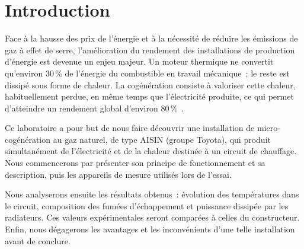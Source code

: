 \section{Introduction}
\label{sec:introduction}

Face à la hausse des prix de l'énergie et à la nécessité de réduire les émissions de gaz à effet de serre, l'amélioration du rendement des installations de production d'énergie est devenue un enjeu majeur. Un moteur thermique ne convertit qu'environ 30\,\% de l'énergie du combustible en travail mécanique~; le reste est dissipé sous forme de chaleur. La cogénération consiste à valoriser cette chaleur, habituellement perdue, en même temps que l'électricité produite, ce qui permet d'atteindre un rendement global d'environ 80\,\%~\cite{picbleu}.

Ce laboratoire a pour but de nous faire découvrir une installation de micro-cogénération au gaz naturel, de type AISIN (groupe Toyota), qui produit simultanément de l'électricité et de la chaleur destinée à un circuit de chauffage. Nous commencerons par présenter son principe de fonctionnement et sa description, puis les appareils de mesure utilisés lors de l'essai.

Nous analyserons ensuite les résultats obtenus~: évolution des températures dans le circuit, composition des fumées d'échappement et puissance dissipée par les radiateurs. Ces valeurs expérimentales seront comparées à celles du constructeur. Enfin, nous dégagerons les avantages et les inconvénients d'une telle installation avant de conclure.
